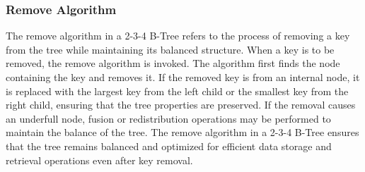 \subsubsection{Remove Algorithm}

The remove algorithm in a 2-3-4 B-Tree refers to the process of removing a key from the tree while maintaining its balanced structure. When a key is to be removed, the remove algorithm is invoked. The algorithm first finds the node containing the key and removes it. If the removed key is from an internal node, it is replaced with the 
largest key from the left child or the smallest key from the right child, ensuring that the tree properties are preserved. If the removal causes an underfull node, fusion or redistribution operations may be performed to maintain the balance of the tree. The remove algorithm in a 2-3-4 B-Tree ensures that the tree remains balanced and 
optimized for efficient data storage and retrieval operations even after key removal.

